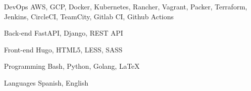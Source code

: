 

\begin{cvskills}

  \cvskill
    {DevOps} %
    {AWS, GCP, Docker, Kubernetes, Rancher, Vagrant, Packer, Terraform, Jenkins, CircleCI, TeamCity, Gitlab CI, Github Actions} %

  \cvskill
    {Back-end} %
    {FastAPI, Django, REST API} %

  \cvskill
    {Front-end} %
    {Hugo, HTML5, LESS, SASS} %

  \cvskill
    {Programming} %
    {Bash, Python, Golang, LaTeX} %

  \cvskill
    {Languages} %
    {Spanish, English} %

\end{cvskills}
